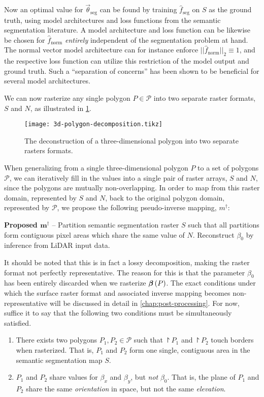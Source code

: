 Now an optimal value for $\vec{\theta}_{\mathrm{seg}}$ can be found by training $\hat{f}_{\mathrm{seg}}$ on $S$ as the ground truth, using model architectures and loss functions from the semantic segmentation literature.
A model architecture and loss function can be likewise be chosen for $\hat{f}_{\mathrm{norm}}$ \emph{entirely} independent of the segmentation problem at hand.
The normal vector model architecture can for instance enforce $||\hat{f}_{\mathrm{norm}}||_2 \equiv 1$, and the respective loss function can utilize this restriction of the model output and ground truth.
Such a \enquote{separation of concerns} has been shown to be beneficial for several model architectures.

We can now rasterize any single polygon $P \in \mathcal{P}$ into two separate raster formats, $S$ and $N$, as illustrated in \cref{fig:3d-polygon-decomposition}.
\begin{figure}
  \centering
  \texttt{[image: 3d-polygon-decomposition.tikz]}
  \caption{The deconstruction of a three-dimensional polygon into two separate rasters formats.}
  \label{fig:3d-polygon-decomposition}
\end{figure}
When generalizing from a single three-dimensional polygon $P$ to a set of polygons $\mathcal{P}$, we can iteratively fill in the values into a single pair of raster arrays, $S$ and $N$, since the polygons are mutually non-overlapping.
In order to map from this raster domain, represented by $S$ and $N$, back to the original polygon domain, represented by $\mathcal{P}$, we propose the following pseudo-inverse mapping, $m^{\dagger}$:
\begin{framed}
  \noindent
  \textbf{Proposed $\mathbf{m^{\dagger}}$} -- Partition semantic segmentation raster $S$ such that all partitions form contiguous pixel areas which share the same value of $N$.
  Reconstruct $\beta_0$ by inference from LiDAR input data.
\end{framed}
\noindent
It should be noted that this is in fact a lossy decomposition, making the raster format not perfectly representative.
The reason for this is that the parameter $\beta_0$ has been entirely discarded when we rasterize $\boldsymbol{\beta}\left(P\right)$.
The exact conditions under which the surface raster format and associated inverse mapping becomes non-representative will be discussed in detail in \cref{chap:post-processing}.
For now, suffice it to say that the following two conditions must be simultaneously satisfied.
\begin{enumerate}
  \item There exists two polygons $P_1, P_2 \in \mathcal{P}$ such that $\project{P_1}$ and $\project{P_2}$ touch borders when rasterized.
    That is, $P_1$ and $P_2$ form one single, contiguous area in the semantic segmentation map $S$.
  \item $P_1$ and $P_2$ share values for $\beta_x$ and $\beta_y$, but \emph{not} $\beta_0$.
    That is, the plane of $P_1$ and $P_2$ share the same \textit{orientation} in space, but not the same \textit{elevation}.
\end{enumerate}
